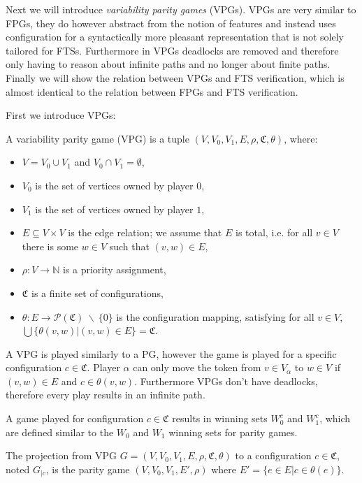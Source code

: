 Next we will introduce \textit{variability parity games} (VPGs). VPGs are very similar to FPGs, they do however abstract from the notion of features and instead uses configuration for a syntactically more pleasant representation that is not solely tailored for FTSs. Furthermore in VPGs deadlocks are removed and therefore only having to reason about infinite paths and no longer about finite paths. Finally we will show the relation between VPGs and FTS verification, which is almost identical to the relation between FPGs and FTS verification.

First we introduce VPGs:
\begin{definition}
\label{def_VPG}
A variability parity game (VPG) is a tuple $(V,V_0, V_1, E, \rho, \mathfrak{C}, \theta)$, where:
\begin{itemize}
	\item $V = V_0 \cup V_1$ and $V_0 \cap V_1 = \emptyset$,
	\item $V_0$ is the set of vertices owned by player $0$,
	\item $V_1$ is the set of vertices owned by player $1$, 
	\item $E \subseteq V \times V$ is the edge relation; we assume that $E$ is total, i.e. for all $v\in V$ there is some $w \in V$ such that $(v,w) \in E$,
	\item $\rho :  V \rightarrow \mathbb{N}$ is a priority assignment,
	\item $\mathfrak{C}$ is a finite set of configurations,
	\item $\theta : E \rightarrow \mathcal{P}(\mathfrak{C})\ \backslash\ \{0\}$ is the configuration mapping, satisfying for all $v \in V$, $\bigcup\{\theta(v,w)|(v,w) \in E\} = \mathfrak{C}$.
\end{itemize}
\end{definition}
A VPG is played similarly to a PG, however the game is played for a specific configuration $c \in \mathfrak{C}$. Player $\alpha$ can only move the token from $v \in V_\alpha$ to $w \in V$ if $(v,w) \in E$ and $c \in \theta(v,w)$. Furthermore VPGs don't have deadlocks, therefore every play results in an infinite path.

A game played for configuration $c \in \mathfrak{C}$ results in winning sets $W_0^c$ and $W_1^c$, which are defined similar to the $W_0$ and $W_1$ winning sets for parity games.

\begin{definition}
\label{def_VPG_proj} The projection from VPG $G = (V, V_0, V_1, E, \rho, \mathfrak{C}, \theta)$ to a configuration $c \in \mathfrak{C}$, noted $G_{|c}$, is the parity game $(V, V_0, V_1, E', \rho)$ where $E' = \{ e\in E | c \in \theta(e)\}$.
\end{definition}

